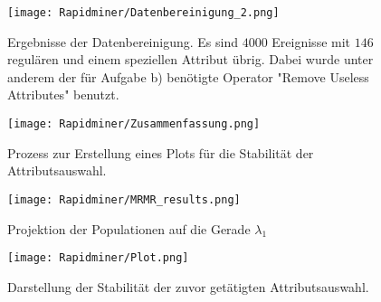 \begin{figure}[H]
	\centering
	\texttt{[image: Rapidminer/Datenbereinigung\_2.png]}
	\caption{Ergebnisse der Datenbereinigung. Es sind $4000$ Ereignisse mit $146$ regulären und einem speziellen Attribut übrig. Dabei wurde unter anderem der für Aufgabe b) benötigte Operator "Remove Useless Attributes" benutzt.}
\end{figure}

\begin{figure}
	\centering
	\texttt{[image: Rapidminer/Zusammenfassung.png]}
	\caption{Prozess zur Erstellung eines Plots für die Stabilität der Attributsauswahl.}
\end{figure}

\begin{figure}
	\centering
	\texttt{[image: Rapidminer/MRMR\_results.png]}
	\caption{ Projektion der Populationen auf die Gerade $\lambda_1$}
\end{figure}

\begin{figure}
	\centering
	\texttt{[image: Rapidminer/Plot.png]}
	\caption{Darstellung der Stabilität der zuvor getätigten Attributsauswahl.}
\end{figure}